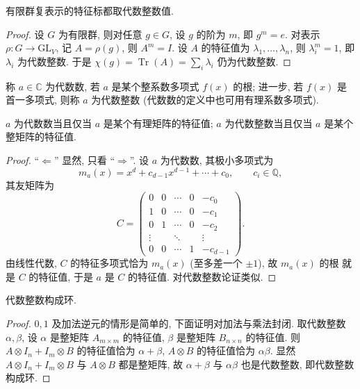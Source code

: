 \begin{theorem}\label{thm:char-algebraic-integer}
有限群复表示的特征标都取代数整数值.
\end{theorem}

\begin{proof}
设 $G$ 为有限群, 则对任意 $g\in G$, 设 $g$ 的阶为 $m$, 即 $g^m=e$.
对表示 $\rho\colon G\to\mathrm{GL}_V$, 记 $A=\rho(g)$, 则 $A^m=I$.
设 $A$ 的特征值为 $\lambda_1,\dots,\lambda_n$, 则 $\lambda_i^m=1$, 即 $\lambda_i$ 为代数整数.
于是 $\chi(g)=\operatorname{Tr}(A)=\sum_i\lambda_i$ 仍为代数整数.
\end{proof}

\begin{remark}\label{rem:algebraic-integer}
称 $a\in\mathbb{C}$ 为代数数, 若 $a$ 是某个整系数多项式 $f(x)$ 的根; 进一步,
若 $f(x)$ 是首一多项式, 则称 $a$ 为代数整数 (代数数的定义中也可用有理系数多项式).
\end{remark}

\begin{lemma}\label{lem:algebraic-eigenvalue}
$a$ 为代数数当且仅当 $a$ 是某个有理矩阵的特征值; $a$ 为代数整数当且仅当
$a$ 是某个整矩阵的特征值.
\end{lemma}

\begin{proof}
``$\Leftarrow$'' 显然, 只看 ``$\Rightarrow$''. 设 $a$ 为代数数, 其极小多项式为
\[
  m_a(x)=x^d+c_{d-1}x^{d-1}+\cdots+c_0,\qquad c_i\in\mathbb{Q},
\]
其友矩阵为
\[
  C=\begin{pmatrix}
    0 & 0 & \cdots & 0 & -c_0\\
    1 & 0 & \cdots & 0 & -c_1\\
    0 & 1 & \cdots & 0 & -c_2\\
    \vdots & & \ddots & & \vdots\\
    0 & 0 & \cdots & 1 & -c_{d-1}
  \end{pmatrix}.
\]
由线性代数, $C$ 的特征多项式恰为 $m_a(x)$ (至多差一个 $\pm1$), 故 $m_a(x)$ 的根
就是 $C$ 的特征值, 于是 $a$ 是 $C$ 的特征值. 对代数整数论证类似.
\end{proof}

\begin{proposition}\label{prop:algebraic-integers-ring}
代数整数构成环.
\end{proposition}

\begin{proof}
$0,1$ 及加法逆元的情形是简单的, 下面证明对加法与乘法封闭.
取代数整数 $\alpha,\beta$, 设 $\alpha$ 是整矩阵 $A_{m\times m}$ 的特征值,
$\beta$ 是整矩阵 $B_{n\times n}$ 的特征值. 则
$A\otimes I_n+I_m\otimes B$ 的特征值恰为 $\alpha+\beta$,
$A\otimes B$ 的特征值恰为 $\alpha\beta$. 显然 $A\otimes I_n+I_m\otimes B$ 与
$A\otimes B$ 都是整矩阵, 故 $\alpha+\beta$ 与 $\alpha\beta$ 也是代数整数,
即代数整数构成环.
\end{proof}

